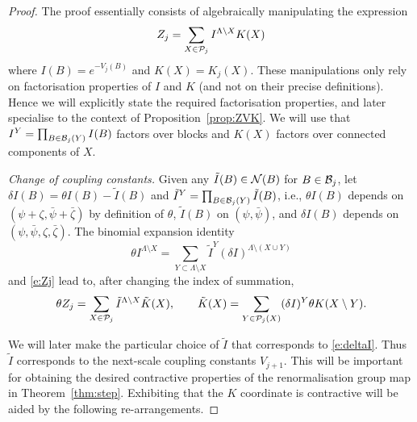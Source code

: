 \documentclass[11pt]{amsart}
\numberwithin{equation}{section}
\numberwithin{theorem}{section}
\newcommand{\1}{{\bf 1}}
\begin{document}
\begin{proof}
The proof essentially consists of algebraically manipulating the expression
\begin{equation}
 \label{e:Zj}
  Z_j = \sum_{X\in \mathcal P_j} I^{\Lambda\setminus X}K(X)
\end{equation}
where $I(B) = e^{-V_j(B)}$ and $K(X)= K_j(X)$.  These manipulations
only rely on factorisation properties of $I$ and $K$ (and not on their
precise definitions). Hence we will explicitly state the required
factorisation properties, and later specialise to the context of
Proposition~\ref{prop:ZVK}.  We will use that
$I^Y = \prod_{B \in \mathcal B_j(Y)} I(B)$ factors over blocks and $K(X)$
factors over connected components of $X$.

\smallskip\noindent
\emph{Change of coupling constants.}
Given any
$\tilde I(B) \in\mathcal N(B)$ for $B \in \mathcal B_j$, let  $\delta I(B) = \theta I(B)-\tilde I(B)$ and
$\tilde I^{Y}= \prod_{B\in \mathcal B_{j}(Y)}\tilde I(B)$,
i.e., $\theta I(B)$ depends on $(\psi+\zeta,\bar\psi+\bar\zeta)$ by definition of $\theta$,
$\tilde I(B)$ on $(\psi,\bar\psi)$, and $\delta I(B)$ depends on $(\psi,\bar\psi,\zeta,\bar\zeta)$.
The binomial expansion identity 
\begin{equation}
  \label{e:thetaI}
  \theta I^{\Lambda\setminus X} = \sum_{Y\subset \Lambda\setminus X}
  \tilde I^{Y}(\delta I)^{\Lambda\setminus (X\cup Y)}
\end{equation}
and \eqref{e:Zj} lead to, after changing the index of summation,
\begin{align}
  \label{e:ZtildeItildeK}
  \theta Z_j = \sum_{X\in \mathcal P_j} \tilde I^{\Lambda\setminus X} \tilde K(X),
  \qquad
    \tilde K(X) 
  = \sum_{Y \in \mathcal P_j(X)} (\delta I)^Y \theta K(X\setminus Y).
\end{align} 

We will later make the particular choice of $\tilde I$ that corresponds to \eqref{e:deltaI}.
  Thus $\tilde I$ corresponds to the next-scale coupling constants $V_{j+1}$.
This will be important for obtaining the desired contractive properties of the
renormalisation group map in Theorem~\ref{thm:step}.
Exhibiting that the $K$ coordinate is contractive will be aided by the following re-arrangements.


\end{proof}
\end{document}
